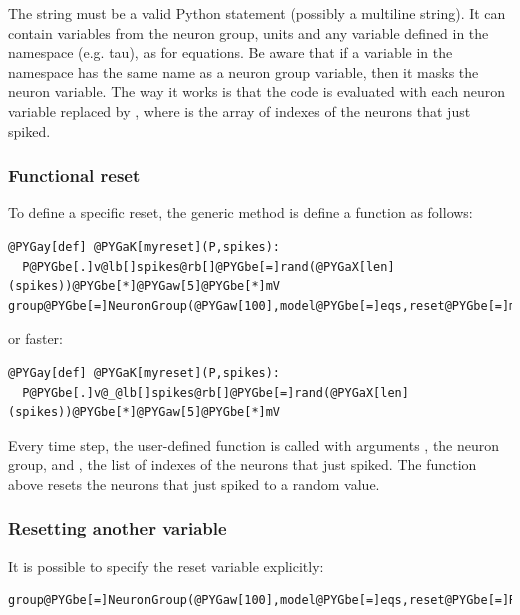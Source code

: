 \documentclass[letterpaper,10pt,english]{manual}
\begin{document}
The string must be a valid Python statement (possibly a multiline string). It can
contain variables from the neuron group, units and any variable defined in the namespace
(e.g. tau), as for equations. Be aware that if a variable in the namespace has the same
name as a neuron group variable, then it masks the neuron variable. The way it works is
that the code is evaluated with each neuron variable  replaced by , where
 is the array of indexes of the neurons that just spiked.


\subsubsection{Functional reset}

To define a specific reset, the generic method is define a function as follows:

\begin{Verbatim}[commandchars=@\[\]]
@PYGay[def] @PYGaK[myreset](P,spikes):
  P@PYGbe[.]v@lb[]spikes@rb[]@PYGbe[=]rand(@PYGaX[len](spikes))@PYGbe[*]@PYGaw[5]@PYGbe[*]mV
group@PYGbe[=]NeuronGroup(@PYGaw[100],model@PYGbe[=]eqs,reset@PYGbe[=]myreset,threshold@PYGbe[=]@PYGaw[10]@PYGbe[*]mV)
\end{Verbatim}

or faster:

\begin{Verbatim}[commandchars=@\[\]]
@PYGay[def] @PYGaK[myreset](P,spikes):
  P@PYGbe[.]v@_@lb[]spikes@rb[]@PYGbe[=]rand(@PYGaX[len](spikes))@PYGbe[*]@PYGaw[5]@PYGbe[*]mV
\end{Verbatim}

Every time step, the user-defined function is called with arguments
, the neuron group, and , the list of indexes of the neurons that just spiked.
The function above resets the neurons that just spiked to a random value.


\subsubsection{Resetting another variable}

It is possible to specify the reset variable explicitly:

\begin{Verbatim}[commandchars=@\[\]]
group@PYGbe[=]NeuronGroup(@PYGaw[100],model@PYGbe[=]eqs,reset@PYGbe[=]Reset(@PYGaw[0]@PYGbe[*]mV,state@PYGbe[=]@PYGad[']@PYGad[w]@PYGad[']),threshold@PYGbe[=]@PYGaw[10]@PYGbe[*]mV)
\end{Verbatim}
\end{document}
